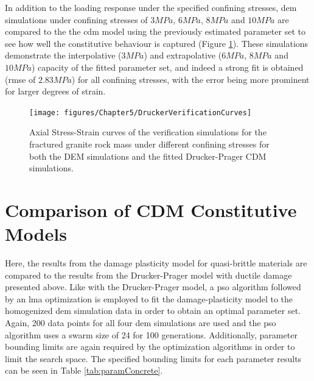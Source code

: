 In addition to the loading response under the specified confining stresses, \acrshort{dem} simulations under confining stresses of $3MPa$, $6MPa$, $8MPa$ and $10MPa$ are compared to the the \acrshort{cdm} model using the previously estimated parameter set to see how well the constitutive behaviour is captured (Figure \ref{fig:fitted2}). These simulations demonstrate the interpolative ($3MPa$) and extrapolative ($6MPa$, $8MPa$ and $10MPa$) capacity of the fitted parameter set, and indeed a strong fit is obtained (\acrshort{rmse} of $2.83MPa$) for all confining stresses, with the error being more prominent for larger degrees of strain.

\begin{figure}[!htb]
\begin{center}
\texttt{[image: figures/Chapter5/DruckerVerificationCurves]}
\caption{{\label{fig:fitted2} Axial Stress-Strain curves of the verification simulations for the fractured granite rock mass under different confining stresses for both the DEM simulations and the fitted Drucker-Prager CDM simulations.%
}}
\end{center}
\end{figure}

\section{Comparison of CDM Constitutive Models}

Here, the results from the damage plasticity model for quasi-brittle materials are compared to the results from the Drucker-Prager model with ductile damage presented above. Like with the Drucker-Prager model, a \acrshort{pso} algorithm followed by an \acrshort{lma} optimization is employed to fit the damage-plasticity model to the homogenized \acrshort{dem} simulation data in order to obtain an optimal parameter set. Again, 200 data points for all four \acrshort{dem} simulations are used and the \acrshort{pso} algorithm uses a swarm size of 24 for 100 generations. Additionally, parameter bounding limits are again required by the optimization algorithms in order to limit the search space. The specified bounding limits for each parameter results can be seen in Table \ref{tab:paramConcrete}.

